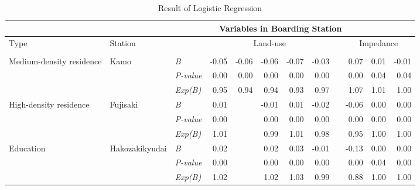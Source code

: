 \documentclass[utf8]{article}
\begin{document}
\begin{table}
	\scriptsize %
	\centering
	\caption{Result of Logistic Regression}
	\label{tab:Result}
	\begin{tabular}{p{7em}p{5em}p{5em}<{\centering}rrrrrrrrr}
		\Xhline{1.5pt}
		
		\multicolumn{2}{c}{Destination Station} & & \multicolumn{9}{c}{Variables in Boarding Station} \\
		\midrule
		
		\multirow{2}[5]{7em}{Type} & \multirow{2}[5]{5em}{Station} & \multirow{2}[5]{5em}{\centering{Statistical index}} & \multicolumn{5}{c}{Land-use} & & \multicolumn{3}{c}{Impedance} \\
		\cmidrule{4-8} \cmidrule{10-12}
		
		& & & 
		\multicolumn{1}{p{5em}}{\centering{Commerce}} & 
		\multicolumn{1}{p{5em}}{\centering{Office}} & 
		\multicolumn{1}{p{5em}}{\centering{Residence}} & 
		\multicolumn{1}{p{5em}}{\centering{Education}} & 
		\multicolumn{1}{p{5em}}{\centering{Land-use Aggregation}} & &  \multicolumn{1}{p{5em}}{\centering{Distance}} & 
		\multicolumn{1}{p{5em}}{\centering{Bus Capacity}} & 
		\multicolumn{1}{p{5em}}{\centering{Bus Accessibility}} \\
		\midrule
		
		\multirow{3}[0]{7em}{Medium-density residence} & \multirow{3}[0]{5em}{Kamo} & \textsl{B} & -0.05 & -0.06 & -0.06 & -0.07 & -0.03 & & 0.07 & 0.01 & -0.01 \\
		& & \textsl{P-value} & 0.00 & 0.00 & 0.00 & 0.00 & 0.00 & & 0.00 & 0.04 & 0.04 \\
		& & \textsl{Exp(B)} & 0.95 & 0.94 & 0.94 & 0.93 & 0.97 & & 1.07 & 1.01 & 1.00 \\
		\midrule
		
		\multirow{3}[0]{7em}{High-density residence} & \multirow{3}[0]{5em}{Fujisaki} & \textsl{B} & 0.01 & & -0.01 & 0.01 & -0.02 & & -0.06 & 0.00 & 0.00 \\
		& & \textsl{P-value} & 0.00 & & 0.00 & 0.00 & 0.00 & & 0.00 & 0.00 & 0.00 \\
		& & \textsl{Exp(B)} & 1.01 & & 0.99 & 1.01 & 0.98 & & 0.95 & 1.00 & 1.00 \\
		\midrule
		
		\multirow{3}[0]{7em}{Education} & \multirow{3}[0]{5em}{Hakozakikyudai} & \textsl{B} & 0.02 & & 0.02 & 0.03 & -0.01 & & -0.13 & 0.00 & 0.00 \\
		& & \textsl{P-value} & 0.00 & & 0.00 & 0.00 & 0.00 & & 0.00 & 0.04 & 0.00 \\
		& & \textsl{Exp(B)} & 1.02 & & 1.02 & 1.03 & 0.99 & & 0.88 & 1.00 & 1.00 \\
		\midrule
		

\end{tabular}
\end{table}
\end{document}
